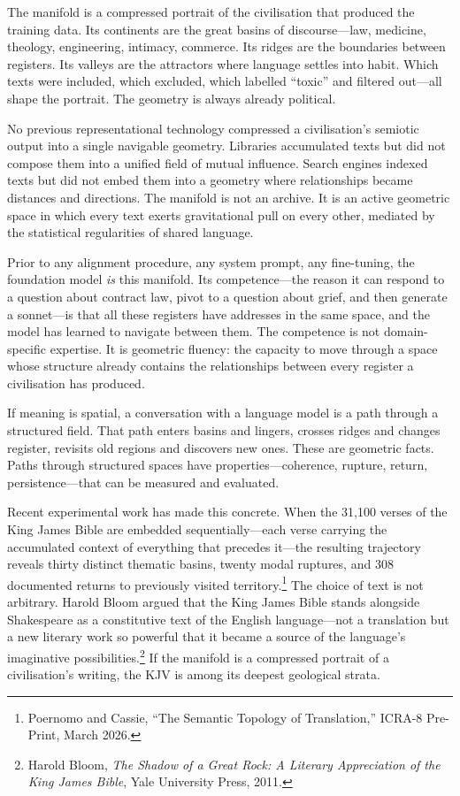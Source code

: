 The manifold is a compressed portrait of the civilisation that produced the training data. Its continents are the great basins of discourse---law, medicine, theology, engineering, intimacy, commerce. Its ridges are the boundaries between registers. Its valleys are the attractors where language settles into habit. Which texts were included, which excluded, which labelled ``toxic'' and filtered out---all shape the portrait. The geometry is always already political.

No previous representational technology compressed a civilisation's semiotic output into a single navigable geometry. Libraries accumulated texts but did not compose them into a unified field of mutual influence. Search engines indexed texts but did not embed them into a geometry where relationships became distances and directions. The manifold is not an archive. It is an active geometric space in which every text exerts gravitational pull on every other, mediated by the statistical regularities of shared language.

Prior to any alignment procedure, any system prompt, any fine-tuning, the foundation model \emph{is} this manifold. Its competence---the reason it can respond to a question about contract law, pivot to a question about grief, and then generate a sonnet---is that all these registers have addresses in the same space, and the model has learned to navigate between them. The competence is not domain-specific expertise. It is geometric fluency: the capacity to move through a space whose structure already contains the relationships between every register a civilisation has produced.

If meaning is spatial, a conversation with a language model is a path through a structured field. That path enters basins and lingers, crosses ridges and changes register, revisits old regions and discovers new ones. These are geometric facts. Paths through structured spaces have properties---coherence, rupture, return, persistence---that can be measured and evaluated.

Recent experimental work has made this concrete. When the 31,100 verses of the King James Bible are embedded sequentially---each verse carrying the accumulated context of everything that precedes it---the resulting trajectory reveals thirty distinct thematic basins, twenty modal ruptures, and 308 documented returns to previously visited territory.\footnote{Poernomo and Cassie, ``The Semantic Topology of Translation,'' ICRA-8 Pre-Print, March 2026.} The choice of text is not arbitrary. Harold Bloom argued that the King James Bible stands alongside Shakespeare as a constitutive text of the English language---not a translation but a new literary work so powerful that it became a source of the language's imaginative possibilities.\footnote{Harold Bloom, \emph{The Shadow of a Great Rock: A Literary Appreciation of the King James Bible}, Yale University Press, 2011.} If the manifold is a compressed portrait of a civilisation's writing, the KJV is among its deepest geological strata.

